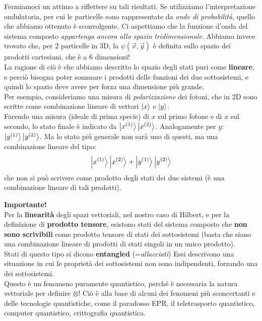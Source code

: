 \documentclass[../../FisicaTeorica.tex]{subfiles}
\begin{document}
Fermiamoci un attimo a riflettere su tali risultati. Se utilizziamo l'interpretazione ondulatoria, per cui le particelle sono rappresentate da \textit{onde di probabilità}, quello che abbiamo ottenuto è sconvolgente. Ci aspettiamo che la funzione d'onda del sistema composto \textit{appartenga ancora allo spazio tridimensionale}. Abbiamo invece trovato che, per $2$ particelle in 3D, la $\psi(\vec{x},\vec{y})$ è definita sullo spazio dei prodotti cartesiani, che è a $6$ dimensioni!\\
La ragione di ciò è che abbiamo descritto lo spazio degli stati puri come \textbf{lineare}, e perciò bisogna poter sommare i prodotti delle funzioni dei due sottosistemi, e quindi lo spazio deve avere per forza una dimensione più grande.\\
Per esempio, consideriamo una misura di \textit{polarizzazione} dei fotoni, che in 2D sono scritte come combinazione lineare di vettori $\Ket{x}$ e $\Ket{y}$.\\
Facendo una misura (ideale di prima specie) di $x$ sul primo fotone e di $x$ sul secondo, lo stato finale è indicato da $\Ket{x^{(1)}}\Ket{x^{(2)}}$. Analogamente per $y$: $\Ket{y^{(1)}}\Ket{y^{(2)}}$. Ma lo stato più generale non sarà uno di questi, ma una combinazione lineare del tipo:
\[
\Ket{x^{(1)}}\Ket{x^{(2)}} + \Ket{y^{(1)}}\Ket{y^{(2)}}
\]
che non si può scrivere come prodotto degli stati dei due sistemi  (è una combinazione lineare di tali prodotti).\\

\begin{oss} \textbf{Importante!}\\
Per la \textbf{linearità} degli spazi vettoriali, nel nostro caso di Hilbert, e per la definizione di \textbf{prodotto tensore}, esistono stati del sistema composto che \textbf{non sono scrivibili} come prodotto tensore di stati dei sottosistemi (basta che siano una combinazione lineare di prodotti di stati singoli  in un unico prodotto).\\
Stati di questo tipo si dicono \textbf{entangled} (=\textit{allacciati}) Essi descrivono una situazione in cui le proprietà dei sottosistemi non sono indipendenti, forzando una  dei sottosistemi.\\
Questo è un fenomeno puramente quantistico, perché è necessaria la natura vettoriale per definire $\otimes$! Ciò è alla base di alcuni dei fenomeni più sconcertanti e delle tecnologie quantistiche, come il paradosso EPR, il teletrasporto quantistico, computer quantistico, crittografia quantistica.
\end{oss}
\end{document}
